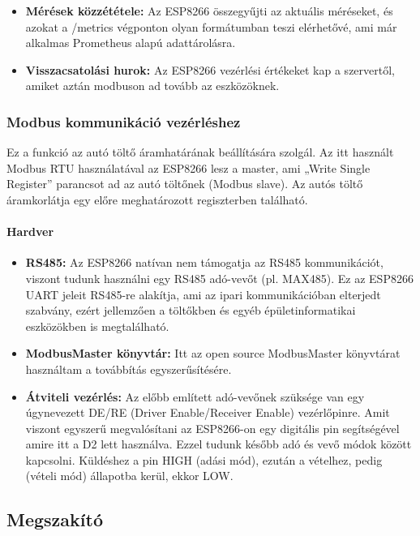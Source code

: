 \begin{itemize}
    \item \textbf{Mérések közzététele:} Az ESP8266 összegyűjti az aktuális méréseket, és azokat a /metrics 
    végponton olyan formátumban teszi elérhetővé, ami már alkalmas Prometheus alapú adattárolásra.
    
    \item \textbf{Visszacsatolási hurok:} Az ESP8266 vezérlési értékeket kap a szervertől, amiket aztán modbuson 
    ad tovább az eszközöknek.
\end{itemize}

\subsubsection{Modbus kommunikáció vezérléshez}
Ez a funkció az autó töltő áramhatárának beállítására szolgál. 
Az itt használt Modbus RTU használatával az ESP8266 lesz a master, ami „Write Single Register” 
parancsot ad az autó töltőnek (Modbus slave). Az autós töltő áramkorlátja egy előre meghatározott 
regiszterben található.

\paragraph{Hardver}

\begin{itemize}
    \item \textbf{RS485:}
    Az ESP8266 natívan nem támogatja az RS485 kommunikációt, viszont tudunk használni egy RS485 adó-vevőt 
    (pl. MAX485). Ez az ESP8266 UART jeleit RS485-re alakítja, ami az ipari kommunikációban elterjedt szabvány, 
    ezért jellemzően a töltőkben és egyéb épületinformatikai eszközökben is megtalálható.
    \item \textbf{ModbusMaster könyvtár:}
    Itt az open source ModbusMaster könyvtárat \cite{ModbusMaster} használtam a továbbítás egyszerűsítésére.
    \item \textbf{Átviteli vezérlés:}
    Az előbb említett adó-vevőnek szüksége van egy úgynevezett DE/RE (Driver Enable/Receiver Enable) vezérlőpinre. 
    Amit viszont egyszerű megvalósítani az ESP8266-on egy digitális pin segítségével amire itt a D2 lett használva. 
    Ezzel tudunk később adó és vevő módok között kapcsolni. Küldéshez a pin HIGH (adási mód), ezután a 
    vételhez, pedig (vételi mód) állapotba kerül, ekkor LOW.
\end{itemize}


\subsection{Megszakító}
